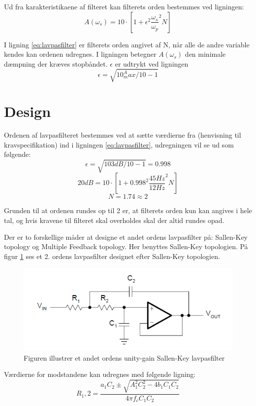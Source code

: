Ud fra karakteristikaene af filteret kan filterets orden bestemmes ved ligningen: 
\begin{equation} \label{eq:lavpasfilter}
A(\omega _s) = 10 \cdot \left[1 + \epsilon^2 \frac{\omega _s}{\omega _p}^2N\right] 
\end{equation}

I ligning \ref{eq:lavpasfilter} er filterets orden angivet af N, når alle de andre variable kendes kan ordenen udregnes. I ligningen betegner $A(\omega _s)$ den minimale dæmpning der kræves stopbåndet. $\epsilon$ er udtrykt ved ligningen
\begin{equation}
\epsilon = \sqrt{10^A_max/10 - 1}
\end{equation}

\section{Design}
Ordenen af lavpasfilteret bestemmes ved at sætte værdierne fra (henvisning til kravspecifikation) ind i ligningen \ref{eq:lavpasfilter}, udregningen vil se ud som følgende:
\begin{equation}
\epsilon = \sqrt{103dB/10 - 1} = 0.998
\end{equation}
\begin{equation}
20dB = 10 \cdot \left[1 + 0.998^2 \frac{45Hz}{12Hz}^2N\right]
\end{equation}
\begin{equation}
N = 1.74 \approx 2
\end{equation}

Grunden til at ordenen rundes op til 2 er, at filterets orden kun kan angives i hele tal, og hvis kravene til filteret skal overholdes skal der altid rundes opad. 

Der er to forskellige måder at designe et andet ordens lavpasfilter på: Sallen-Key topology og Multiple Feedback topology. Her benyttes Sallen-Key topologien. På figur \ref{fig:SallenKey} ses et 2. ordens lavpasfilter designet efter Sallen-Key topologien.
\begin{figure}[H]
\includegraphics[scale=1]{figures/cProblemloesning/SallenLavpas.PNG}
\caption{Figuren illustrer et andet ordens unity-gain Sallen-Key lavpasfilter}
\label{fig:SallenKey}
\end{figure}
Værdierne for modstandene kan udregnes med følgende ligning:
\begin{equation} \label{eq:LavpasModstande}
R_1,2 = \frac{a_1 C_2 \pm \sqrt{A_1^2 C_2^2 - 4b_1 C_1 C_2}}{4 \pi f_c C_1 C_2}
\end{equation}

